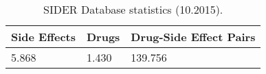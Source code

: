 \begin{table}
\caption{SIDER Database statistics (10.2015).}
\centering
\begin{tabular}{|l|l|l|}
\hline
\textbf{Side Effects} & \textbf{Drugs} & \textbf{Drug-Side Effect Pairs} \\ \hline
5.868        & 1.430 & 139.756 \\ \hline
\end{tabular}
\label{tab:sider_stats}
\end{table}